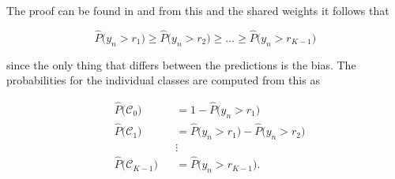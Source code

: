 The proof can be found in \cite{Cao2019} and from this and the shared weights it follows that

\begin{equation}
 \widehat{P} \big( y_n > r_1 \big) \geq \widehat{P} \big( y_n > r_2 \big) \geq \hdots \geq \widehat{P} \big( y_n > r_{K-1} \big)
\end{equation}

since the only thing that differs between the predictions is the bias. The probabilities for the individual classes are computed from this as

\begin{equation}
 \begin{alignedat}{2}
  &\widehat{P}\big(\mathcal{C}_0 \big) &&= 1 - \widehat{P}\big(y_n > r_1\big) \\
  &\widehat{P}\big(\mathcal{C}_1 \big) &&= \widehat{P}\big(y_n > r_1\big) - \widehat{P}\big(y_n > r_2\big) \\
  & &&\vdots \\
  &\widehat{P}\big(\mathcal{C}_{K-1} \big) &&= \widehat{P}\big(y_n > r_{K-1}\big).
 \end{alignedat}
\end{equation}
